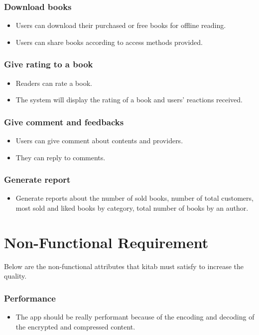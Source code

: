 	\subsubsection{Download books}
	\begin{itemize}
		\item Users can download their purchased or free books for offline reading.
		\item Users can share books according to access methods provided.
	\end{itemize}

	\subsubsection{Give rating to a book}
	\begin{itemize}
		\item Readers can rate a book.
		\item The system will display the rating of a book and users’ reactions received.
	\end{itemize}

	\subsubsection{Give comment and feedbacks}
	\begin{itemize}
		\item Users can give comment about contents and providers.
		\item They can reply to comments.
	\end{itemize}

	\subsubsection{Generate report}
	\begin{itemize}
		\item Generate reports about the number of sold books, number of total customers, most sold and liked books by category, total number of books by an author.
	\end{itemize}

\section{Non-Functional Requirement}

Below are the non-functional attributes that kitab must satisfy to increase the quality.

	\subsubsection{Performance}
	\begin{itemize}
		\item The app should be really performant because of the encoding and decoding of the encrypted and compressed content. 
	\end{itemize}

